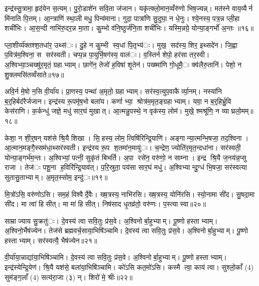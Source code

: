इन्द्र॑स्सु॒त्रामा॒ हृद॑येन स॒त्यम्। पु॒रो॒डाशे॑न सवि॒ता ज॑जान। यकृ॑त्क्लो॒मान॒व्वँरु॑णो भिष॒ज्यन्न्। मत॑स्ने वाय॒व्यैर्न मि॑नाति पि॒त्तम्। आ॒न्त्राणि॑ स्था॒ली मधु॒ पिन्व॑माना। गुदा॒ पात्रा॑णि सु॒दुघा॒ न धे॒नुः। श्ये॒नस्य॒ पत्र॒न्न प्ली॒हा शची॑भिः। आ॒स॒न्दी नाभि॑रु॒दर॒न्न मा॒ता। कु॒म्भो व॑नि॒ष्ठुर्ज॑नि॒ता शची॑भिः। यस्मि॒न्नग्रे॒ योन्या॒ङ्गर्भो॑ अ॒न्तः ॥१६॥

प्ला॒शीर्व्य॑क्तश्श॒तधा॑र॒ उथ्स॑ः। दु॒हे न कु॒म्भी स्व॒धां पि॒तृभ्य॑ः। मुख॒ सद॑स्य॒ शिर॒ इथ्सदे॑न। जि॒ह्वा प॒वित्र॑म॒श्विना॒ स सर॑स्वती। चप्प॒न्न पा॒युर्भि॒षग॑स्य॒ वाल॑ः। व॒स्तिर्न शेपो॒ हर॑सा तर॒स्वी। अ॒श्विभ्या॒ञ्चख्षु॑र॒मृतं॒ ग्रहाभ्याम्। छागे॑न॒ तेजो॑ ह॒विषा॑ शृ॒तेन॑। पख्ष्मा॑णि गो॒धूमै॒ः क्व॑लैरु॒तानि॑। पेशो॒ न शु॒क्लमसि॑तव्वँसाते॥१७॥

अवि॒र्न मे॒षो न॒सि वी॒र्या॑य। प्रा॒णस्य॒ पन्था॑ अ॒मृतो॒ ग्रहाभ्याम्। सर॑स्व॒त्युप॒वाकैर्व्या॒नम्। नस्या॑नि ब॒र्॒हिर्बद॑रैर्जजान। इन्द्र॑स्य रू॒पमृ॑ष॒भो बला॑य। कर्णाभ्या॒ श्रोत्र॑म॒मृत॒ङ्ग्रहाभ्याम्। यवा॒ न ब॒र्॒हिर्भ्रु॒वि केस॑राणि। क॒र्कन्धु॑ जज्ञे॒ मधु॑ सार॒घं मुखात्। आ॒त्मन्नु॒पस्थे॒ न वृक॑स्य॒ लोम॑। मुखे॒ श्मश्रू॑णि॒ न व्याघ्रलो॒मम्॥१८॥

केशा॒ न शी॒र्॒षन्‌ यश॑से श्रि॒यै शिखा। सि॒हस्य॒ लोम॒ त्विषि॑रिन्द्रि॒याणि॑। अङ्गान्या॒त्मन्भि॒षजा॒ तद॒श्विना। आ॒त्मान॒मङ्गै॒स्सम॑धा॒थ्सर॑स्वती। इन्द्र॑स्य रू॒प श॒तमा॑न॒मायु॑ः। च॒न्द्रेण॒ ज्योति॑र॒मृत॒न्दधा॑ना। सर॑स्वती॒ योन्या॒ङ्गर्भ॑म॒न्तः। अ॒श्विभ्यां॒ पत्नी॒ सुकृ॑तं बिभर्ति। अ॒पा रसे॑न॒ वरु॑णो॒ न साम्ना। इन्द्र श्रि॒यै ज॒नय॑न्न॒प्सु राजा। तेज॑ः पशू॒ना ह॒विरि॑न्द्रि॒याव॑त्। प॒रि॒स्रुता॒ पय॑सा सार॒घं मधु॑। अ॒श्विभ्यान्दु॒ग्धं भि॒षजा॒ सर॑स्वत्या सुतासु॒ताभ्याम्। अ॒मृत॒स्सोम॒ इन्दु॑ः॥१९॥


मि॒त्रो॑ऽसि॒ वरु॑णोऽसि। सम॒हं विश्वैर्दे॒वैः। ख्ष॒त्रस्य॒ नाभि॑रसि। ख्ष॒त्रस्य॒ योनि॑रसि। स्यो॒नामा सी॑द। सु॒षदा॒मा सी॑द। मा त्वा॑ हिसीत्। मा मा॑ हिसीत्। निष॑साद धृ॒तव्र॑तो॒ वरु॑णः। प॒स्त्यास्वा॥२०॥

साम्राज्याय सु॒क्रतु॑ः। दे॒वस्य॑ त्वा सवि॒तुः प्र॑स॒वे। अ॒श्विनोर्बा॒हुभ्याम्। पू॒ष्णो हस्ताभ्याम्। अ॒श्विनो॒र्भैष॑ज्येन। तेज॑से ब्रह्मवर्च॒साया॒भिषि॑ञ्चामि। दे॒वस्य॑ त्वा सवि॒तुः प्र॑स॒वे। अ॒श्विनोर्बा॒हुभ्याम्। पू॒ष्णो हस्ताभ्याम्। सर॑स्वत्यै॒ भैष॑ज्येन॥२१॥

वी॒र्या॑या॒न्नाद्या॑या॒भिषि॑ञ्चामि। दे॒वस्य॑ त्वा सवि॒तुः प्र॑स॒वे। अ॒श्विनोर्बा॒हुभ्याम्। पू॒ष्णो हस्ताभ्याम्। इन्द्र॑स्येन्द्रि॒येण॑। श्रि॒यै यश॑से॒ बला॑या॒भिषि॑ञ्चामि। को॑ऽसि कत॒मो॑ऽसि। कस्मै त्वा॒ काय॑ त्वा। सुश्लो॒काँ (4) सुम॑ङ्ग॒लाँ (4) सत्य॑रा॒जा (३) न्। शिरो॑ मे॒ श्रीः॥२२॥


